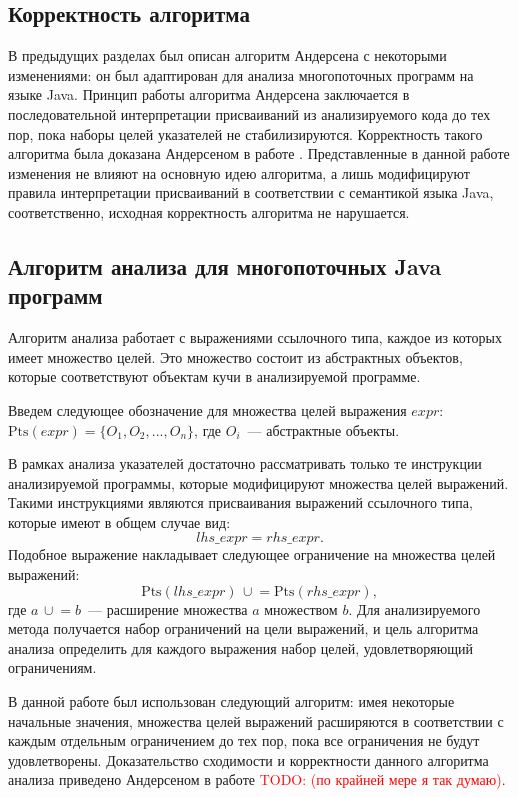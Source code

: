 \documentclass[14pt,titlepage]{extarticle}
\newcommand{\Pts}[1]{\textrm{Pts}(#1)}
\newcommand{\cupe}{\,\cup\!\!=}
\newcommand{\todo}[1]{\textcolor{red}{\eng{TODO}: #1}}
\newcommand{\eng}[1]{{\English#1}}
\begin{document}
    \subsection{Корректность алгоритма}

      В предыдущих разделах был описан алгоритм Андерсена с некоторыми
      изменениями: он был адаптирован для анализа многопоточных программ на
      языке Java.
      Принцип работы алгоритма Андерсена заключается в последовательной
      интерпретации присваиваний из анализируемого кода до тех пор, пока наборы
      целей указателей не стабилизируются. Корректность такого алгоритма была
      доказана Андерсеном в работе \cite{andersen}.
      Представленные в данной работе изменения не влияют на основную идею
      алгоритма, а лишь модифицируют правила интерпретации присваиваний в
      соответствии с семантикой языка Java, соответственно, исходная
      корректность алгоритма не нарушается.

    \subsection{Алгоритм анализа для многопоточных Java программ}

      Алгоритм анализа работает с выражениями ссылочного типа, каждое из
      которых имеет множество целей. Это множество состоит из абстрактных
      объектов, которые соответствуют объектам кучи в анализируемой программе.

      Введем следующее обозначение для множества целей выражения $expr$:
      $\Pts{expr} = \{O_1, O_2, ..., O_n\}$, где $O_i$~--- абстрактные объекты.

      В рамках анализа указателей достаточно рассматривать только те инструкции
      анализируемой программы, которые модифицируют множества целей выражений.
      Такими инструкциями являются присваивания выражений ссылочного типа,
      которые имеют в общем случае вид:
      \[lhs\_expr = rhs\_expr.\]
      Подобное выражение накладывает следующее ограничение на множества целей
      выражений:
      \[\Pts{lhs\_expr} \cupe \Pts{rhs\_expr},\]
      где $a \cupe b$~--- расширение множества $a$ множеством $b$.
      Для анализируемого метода получается набор ограничений на цели выражений,
      и цель алгоритма анализа определить для каждого выражения набор целей,
      удовлетворяющий ограничениям.

      В данной работе был использован следующий алгоритм: имея некоторые
      начальные значения, множества целей выражений расширяются в соответствии
      с каждым отдельным ограничением до тех пор, пока все ограничения не будут
      удовлетворены. Доказательство сходимости и корректности данного алгоритма
      анализа приведено Андерсеном в работе \cite{andersen}
      \todo{(по крайней мере я так думаю)}.
\end{document}
